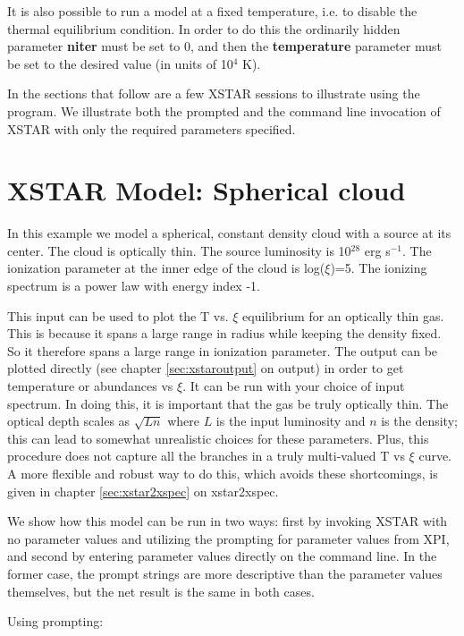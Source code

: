 It is also possible to run a model at a fixed temperature, i.e. to 
disable the thermal equilibrium condition.  In order to do this the
ordinarily hidden parameter {\bf niter} must be set to 0, and then
the {\bf temperature} parameter must be set to the desired value
(in units of 10$^4$ K).


In the sections that follow are a few XSTAR sessions to 
illustrate using the program.  We illustrate both the prompted 
and the command line invocation of XSTAR with only the required parameters
specified.  


\section{XSTAR Model: Spherical cloud}

In this example we model a spherical, constant density cloud with a source 
at its center.  The cloud is optically thin. The source luminosity is 10$^{28}$ erg s$^{-1}$.  
The ionization parameter at the inner edge of the cloud
is log($\xi$)=5.  The ionizing spectrum 
is a power law with energy index -1.  

This input can be used to plot the T vs. $\xi$ equilibrium for an optically thin
 gas.    This is because it spans a large range in radius while keeping the 
density fixed.  So it therefore spans a large range in ionization parameter.  
The output can be plotted directly (see chapter \ref{sec:xstaroutput} 
on output) in order to
get temperature or abundances vs $\xi$.  It can be run with your choice of 
input spectrum.  In doing this, it is important that the gas be truly 
optically thin.  The optical depth scales as $\sqrt{Ln}$ where $L$ is the input 
luminosity and $n$ is the density; this can lead to somewhat unrealistic 
choices for these parameters.  Plus, this procedure does not capture all 
the branches in a truly multi-valued T vs $\xi$ curve.
A more flexible and robust way to do this, which avoids these 
shortcomings, is given in chapter \ref{sec:xstar2xspec} on xstar2xspec.


We show how this model
can be run in two ways: first by invoking XSTAR with no parameter values
and utilizing the prompting for parameter values from XPI, and second by entering 
parameter values directly on the command line.  In the former case, the prompt strings are 
more descriptive than the parameter values themselves, but the net result is the same 
in both cases.  

Using prompting:

